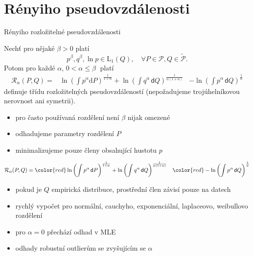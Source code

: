 \documentclass[11pt]{beamer}
\begin{document}
\section{Rényiho pseudovzdálenosti} %
\begin{frame}{Rényiho rozložitelné pseudovzdálenosti}
\begin{theorem}
Nechť pro nějaké $\beta>0$ platí
	\begin{equation*}
		p^\beta, q^\beta,\ln{p} \in \mathrm{L}_1(Q), \quad \forall P \in \mathcal{P}, Q \in \mathcal{\tilde{P}}.
	\end{equation*}
	Potom pro každé $\alpha$, $0 < \alpha \leq \beta\;$ platí
{\footnotesize
\begin{align*}
 \mathcal{R}_\alpha (P,Q) = & \ln{\left( \int{p^\alpha \mathrm{d}P } \right)^{\frac{1}{1+\alpha}}} + 
						\ln{\left( \int{q^\alpha \,\mathsf{d}Q } \right)^{\frac{1}{\alpha (1+\alpha)}}} 
						& - \ln{\left( \int{p^\alpha \,\mathsf{d}Q } \right)^{ \frac{1}{\alpha}}}
\end{align*}}definuje třídu rozložitelných pseudovzdáleností %
(nepožadujeme trojúhelníkovou nerovnost ani symetrii).
\end{theorem}
\pause
\begin{itemize}
\item pro často používaná rozdělení není $\beta$ nijak omezené
\end{itemize}
\end{frame}

\begin{frame}
\begin{itemize}
\item odhadujeme parametry rozdělení $P$
\item minimalizujeme pouze {\color{red}členy} obsahující hustotu $p$ 
\end{itemize}

{\footnotesize
\begin{align*}
 			\mathcal{R}_\alpha (P,Q) = & \; {\color{red}\ln{\left( \int{p^\alpha \,\mathsf{d}P } \right)^{\frac{1}{1+\alpha}}}} + 
						\ln{\left( \int{q^\alpha \,\mathsf{d}Q } \right)^{\frac{1}{\alpha (1+\alpha)}}} 
						& {\color{red} - \ln{\left( \int{p^\alpha \,\mathsf{d}Q } \right)^{ \frac{1}{\alpha}}}}
\end{align*}}
\begin{itemize} 
\item pokud je $Q$ empirická distribuce, prostřední člen závisí pouze na datech
\pause
\item rychlý vypočet pro normální, cauchyho, exponenciální, laplaceovo, weibullovo rozdělení
\item pro $\alpha = 0$ přechází odhad v MLE 
\item odhady robustní outlierům se zvyšujícím se $\alpha$

\end{itemize}
\end{frame}
\end{document}
